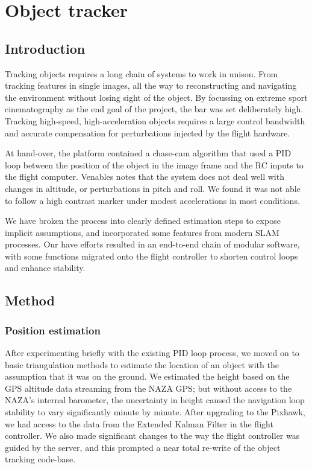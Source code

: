 \documentclass{article}
\begin{document}
\section{Object tracker}
  \subsection{Introduction}
  
    Tracking objects requires a long chain of systems to work in unison.  From tracking features in single images, all the way to reconstructing and navigating the environment without losing sight of the object.
    By focussing on extreme sport cinematography as the end goal of the project, the bar was set deliberately high.
    Tracking high-speed, high-acceleration objects requires a large control bandwidth and accurate compensation for perturbations injected by the flight hardware.  

    At hand-over, the platform contained a chase-cam algorithm that used a PID loop between the position of the object in the image frame and the RC inputs to the flight computer.  Venables \cite{Venables} notes that the system does not deal well with changes in altitude, or perturbations in pitch and roll.  We found it was not able to follow a high contrast marker under modest accelerations in most conditions.

    We have broken the process into clearly defined estimation steps to expose implicit assumptions, and incorporated some features from modern SLAM processes.  Our have efforts resulted in an end-to-end chain of modular software, with some functions migrated onto the flight controller to shorten control loops and enhance stability. 

  \subsection{Method}

    \subsubsection{Position estimation}
      After experimenting briefly with the existing PID loop process, we moved on to basic triangulation methods to estimate the location of an object with the assumption that it was on the ground.  We estimated the height based on the GPS altitude data streaming from the NAZA GPS; but without access to the NAZA's internal barometer, the uncertainty in height caused the navigation loop stability to vary significantly minute by minute.
      After upgrading to the Pixhawk, we had access to the data from the Extended Kalman Filter in the flight controller.  We also made significant changes to the way the flight controller was guided by the server, and this prompted a near total re-write of the object tracking code-base.
\end{document}
